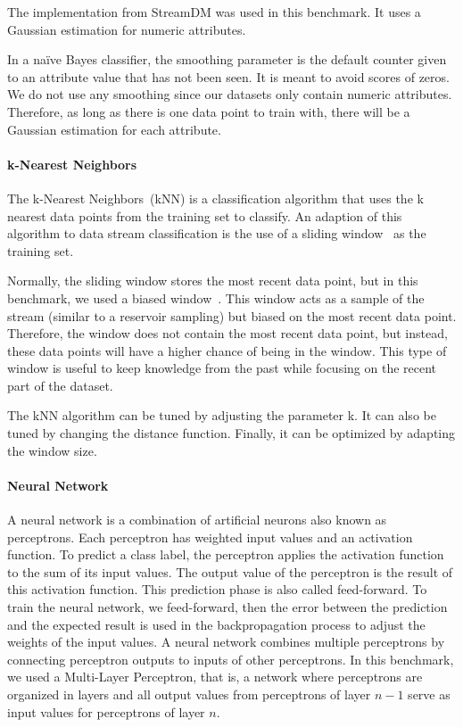 The implementation from StreamDM was used in this
benchmark. It uses a Gaussian
estimation for numeric attributes.

In a naïve Bayes classifier, the smoothing parameter is the
default counter given to an attribute value that
has not been seen. It is meant to avoid scores of zeros.
We do not use any smoothing since our datasets
only contain numeric
attributes. Therefore, as long as there is one data
point to train with, there will be a Gaussian
estimation for each attribute.

\paragraph{k-Nearest Neighbors}

The k-Nearest Neighbors~(kNN) is a classification
algorithm that uses the k nearest data points from
the training set to classify.  An adaption of this
algorithm to data stream classification is the use
of a sliding window~\cite{Mining_Massive_Datasets}
as the training set.

Normally, the sliding window stores the most
recent data point, but in this benchmark, we used
a biased window~\cite{biased_reservoir_sampling}.
This window acts as a sample of
the stream (similar to a reservoir sampling) but
biased on the most recent data point.  Therefore,
the window does not contain the most recent data
point, but instead, these data points will have a
higher chance of being in the window.  This type
of window is useful to keep knowledge from the
past while focusing on the recent part of the
dataset.

The kNN algorithm can be tuned by adjusting the
parameter k. It can also be tuned by changing the
distance function. Finally, it can be optimized by
adapting the window size.

\paragraph{Neural Network}
A neural network is a combination of artificial
neurons also known as perceptrons. Each
perceptron has weighted input values and an
activation function. To predict a class label, the
perceptron applies the activation function to the sum
of its input values. The output
value of the perceptron is the result of this
activation function. This prediction phase is also
called feed-forward. To train the neural network,
we feed-forward, then the error between the
prediction and the expected result is used in the
backpropagation process to adjust the weights of
the input values.  A neural network combines
multiple perceptrons by connecting perceptron outputs
to inputs of other perceptrons.  In
this benchmark, we used a Multi-Layer Perceptron, 
that is, a network where perceptrons are organized in
layers and all output
values from perceptrons of layer $n-1$ serve as
input values for perceptrons of layer $n$. 

